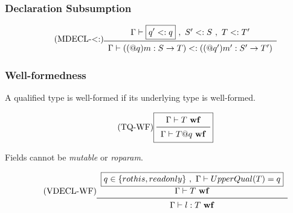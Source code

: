 \vspace{0.4cm}


\newpage


\subsubsection{Declaration Subsumption}



\begin{equation*}\tag{\mbox{MDECL-$<:$}}\label{equ-mdecl-lt}
\begin{array}{c}
\Gamma \vdash \boxed{q' <: q}\ ,\ S' <: S\ ,\ T <: T' \\
\midrule
\Gamma \vdash ( (@q)m: S \rightarrow T) <: ( (@q')m': S' \rightarrow T') \\
\end{array}
\end{equation*}

\vspace{0.4cm}


\subsubsection{Well-formedness}

A qualified type is well-formed if its underlying type is well-formed.

\begin{equation*}\tag{\mbox{TQ-WF}}\label{equ-tq-wf}
\boxed{
\begin{array}{c}
\Gamma \vdash T\ {\bf wf} \\
\midrule
\Gamma \vdash T@q\ {\bf wf} \\
\end{array}
}
\end{equation*}

\vspace{0.4cm}

Fields cannot be {\em mutable} or {\em roparam}.

\begin{equation*}\tag{\mbox{VDECL-WF}}\label{equ-vdecl-wf}
\begin{array}{c}
\boxed{q \in \{ rothis, readonly \}\ ,\ \Gamma \vdash UpperQual(T) = q}\\
\Gamma \vdash T\ {\bf wf} \\
\midrule
\Gamma \vdash l:T\ {\bf wf} \\
\end{array}
\end{equation*}

